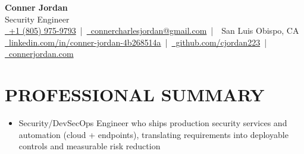 \documentclass[letterpaper,10pt]{article}
\newcommand{\resumeBodySize}{\small}
\newcommand{\resumeHeaderRoleSize}{\Large}
\newcommand{\resumeSectionIntroGap}{8pt}
\newcommand{\resumeSectionOutroGap}{6pt}
\newcommand{\resumeHeaderBottomGap}{4pt}
\renewcommand{\resumeBodySize}{\footnotesize}
\renewcommand{\resumeHeaderRoleSize}{\large}
\renewcommand{\resumeSectionIntroGap}{5pt}
\renewcommand{\resumeSectionOutroGap}{4pt}
\renewcommand{\resumeHeaderBottomGap}{2pt}
\renewcommand{\resumeSectionIntroGap}{10pt}
\renewcommand{\resumeSectionOutroGap}{8pt}
\renewcommand{\resumeHeaderBottomGap}{6pt}
\newcommand{\resumeSubHeadingListStart}{\begin{itemize}[leftmargin=0in,label={}]}
\newcommand{\resumeSubHeadingListEnd}{\end{itemize}}
\begin{document}
\begin{center}
  {\Huge \textbf{Conner Jordan}}\\[0pt]
  {\resumeHeaderRoleSize Security Engineer}\\[0pt]
  \href{tel:+18059759793}{\faPhone\ +1 (805) 975-9793} \,|\, 
  \href{mailto:connercharlesjordan@gmail.com}{\faEnvelope\ connercharlesjordan@gmail.com} \,|\, 
  \faMapMarker\ San Luis Obispo, CA \\[-2pt]
  \href{https://www.linkedin.com/in/conner-jordan-4b268514a/}{\faLinkedin\ linkedin.com/in/conner-jordan-4b268514a}
  \,|\, \href{https://github.com/cjordan223}{\faGithub\ github.com/cjordan223}
  \,|\, \href{https://connerjordan.com/}{\faGlobe\ connerjordan.com}
\end{center}

\vspace{\resumeHeaderBottomGap}

\section{PROFESSIONAL SUMMARY}
\vspace{\resumeSectionIntroGap}
\resumeSubHeadingListStart
\item {\resumeBodySize
Security/DevSecOps Engineer who ships production security services and automation (cloud + endpoints), translating requirements into deployable controls and measurable risk reduction}
\resumeSubHeadingListEnd
\vspace{\resumeSectionOutroGap}

\end{document}
